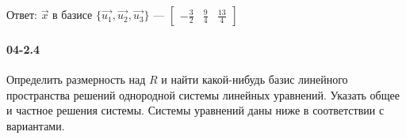 \documentclass[12pt]{article}
\begin{document}
	\\\\
	Ответ: 
	\ensuremath{\vec{x}} в базисе \ensuremath{\{\vec{u_{1}}, \vec{u_{2}}, \vec{u_{3}}\}} --- \ensuremath{\begin{bmatrix}
		-\frac{3}{2} & \frac{9}{4} & \frac{13}{4}
	\end{bmatrix}}


	\clearpage
	\paragraph{04-2.4} Определить размерность над \ensuremath{R} и найти какой-нибудь базис линейного пространства решений однородной системы линейных уравнений. Указать общее и частное решения системы. Системы уравнений даны ниже в соответствии с вариантами.
\end{document}
